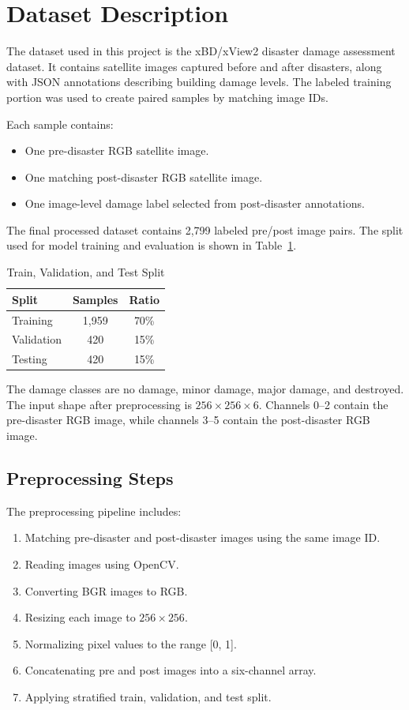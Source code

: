 \documentclass[conference]{IEEEtran}
\begin{document}
\section{Dataset Description}
The dataset used in this project is the xBD/xView2 disaster damage assessment dataset. It contains satellite images captured before and after disasters, along with JSON annotations describing building damage levels. The labeled training portion was used to create paired samples by matching image IDs.

Each sample contains:
\begin{itemize}
    \item One pre-disaster RGB satellite image.
    \item One matching post-disaster RGB satellite image.
    \item One image-level damage label selected from post-disaster annotations.
\end{itemize}

The final processed dataset contains 2,799 labeled pre/post image pairs. The split used for model training and evaluation is shown in Table~\ref{tab:split}.

\begin{table}[h]
\centering
\caption{Train, Validation, and Test Split}
\label{tab:split}
\begin{tabular}{lcc}
\toprule
\textbf{Split} & \textbf{Samples} & \textbf{Ratio} \\
\midrule
Training & 1,959 & 70\% \\
Validation & 420 & 15\% \\
Testing & 420 & 15\% \\
\bottomrule
\end{tabular}
\end{table}

The damage classes are no damage, minor damage, major damage, and destroyed. The input shape after preprocessing is \(256 \times 256 \times 6\). Channels 0--2 contain the pre-disaster RGB image, while channels 3--5 contain the post-disaster RGB image.

\subsection{Preprocessing Steps}
The preprocessing pipeline includes:
\begin{enumerate}
    \item Matching pre-disaster and post-disaster images using the same image ID.
    \item Reading images using OpenCV.
    \item Converting BGR images to RGB.
    \item Resizing each image to \(256 \times 256\).
    \item Normalizing pixel values to the range [0, 1].
    \item Concatenating pre and post images into a six-channel array.
    \item Applying stratified train, validation, and test split.
\end{enumerate}
\end{document}
